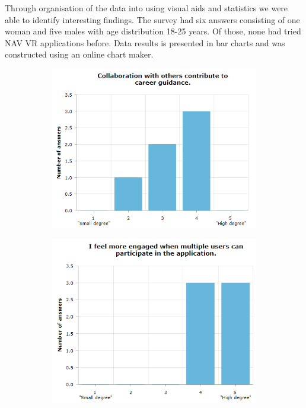 Through organisation of the data into using visual aids and statistics we were able to identify interesting findings. The survey had six answers consisting of one woman and five males with age distribution 18-25 years. Of those, none had tried NAV VR applications before. Data results is presented in bar charts and was constructed using an online chart maker. 


\begin{figure}[H]
  \begin{subfigure}[b]{0.5\textwidth}
    \captionsetup{width=0.8\linewidth}
    \includegraphics[width=1\textwidth]{fig/phase_2/charts/collabIncreaseCareer.PNG}
    \caption{}
    \label{fig:phase2_collabIncreaseCareer}
  \end{subfigure}
  \hfill%
  \begin{subfigure}[b]{0.5\textwidth}
    \captionsetup{width=0.8\linewidth}
    \includegraphics[width=1\textwidth]{fig/phase_2/charts/collabMoreEngaged.PNG}

\end{subfigure}
\end{figure}
